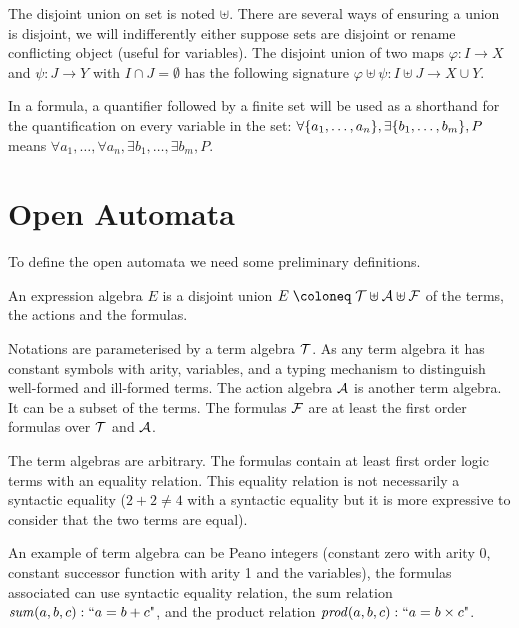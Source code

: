 \documentclass{article}
\begin{document}
The disjoint union on set is noted \(\uplus\).
There are several ways of ensuring a union is disjoint, we will indifferently either suppose sets are disjoint or rename conflicting object (useful for variables).
The disjoint union of two maps \(\varphi: I \to X\) and \(\psi: J \to Y\) with \(I \cap J = \emptyset\) has the following signature \(\varphi \uplus \psi: I \uplus J \to X \cup Y\).

In a formula, a quantifier followed by a finite set will be used as a shorthand for the quantification on every variable in the set:
\(\forall {\left\{a_1, \dots, a_n\right\}}, \exists {\left\{b_1, \dots, b_m\right\}}, P\) means \(\forall a_1, \dots, \forall a_n, \exists b_1, \dots, \exists b_m, P\).


\section{Open Automata}\label{sec:def}
To define the open automata we need some preliminary definitions.
\begin{defi}
An expression algebra \(E\) is a disjoint union \(E \defobject \terms \uplus \actions \uplus \formulas\) of the terms, the actions and the formulas.

Notations are parameterised by a term algebra \({\mathcal{T}}\).
As any term algebra it has constant symbols with arity, variables, and a typing mechanism to distinguish well-formed and ill-formed terms.
The action algebra \(\mathcal{A}\) is another term algebra.
It can be  a subset of the terms.
The formulas \({\mathcal{F}}\) are at least the first order formulas over \({\mathcal{T}}\) and \(\mathcal{A}\).
\end{defi}
The term algebras are arbitrary.
The formulas contain at least first order logic terms with an equality relation.
This equality relation is not necessarily a syntactic equality (\(2 + 2 \neq 4\) with a syntactic equality but it is more expressive to consider that the two terms are equal).

An example of term algebra can be Peano integers (constant zero with arity 0, constant successor function with arity 1 and the variables), the formulas associated can use syntactic equality relation, the sum relation \(\mathit{sum}{\left(a, b, c\right)}: \text{``}a = b + c\text{"}\), and the product relation \(\mathit{prod}{\left(a, b, c\right)}: \text{``}a = b \times c\text{"}\).
\end{document}
